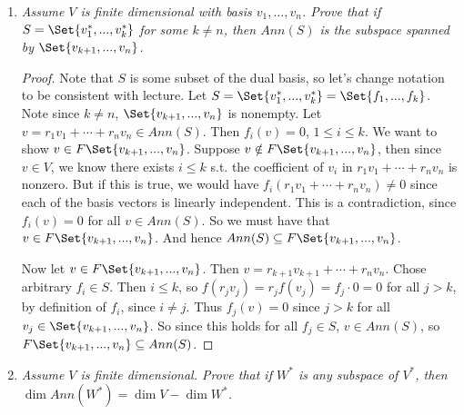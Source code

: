 \documentclass[9pt,reqno,twoside]{amsbook}
\theoremstyle{plain}
\numberwithin{section}{chapter}
\numberwithin{equation}{chapter}
\theoremstyle{definition}
\theoremstyle{remark}
\theoremstyle{plain}
\newcommand{\sub}{\subseteq}
\newcommand{\bb}{\vspace{3mm}}
\renewcommand{\leq}{\leqslant}
\begin{document}
\begin{enumerate}[label=\arabic*.]
\begin{enumerate}
\begin{proof}
 
 
 
 Now let $v \in Ann(S)$. Then since $B_S \sub S$, we know $v \in Ann(B_S)$. Then 
 $$
 FS \sub FB_S = F\Set{f_1,...,f_k} = \Set{r_1f_1 + \cdots + r_kf_k:r_i \in F, f_i \in B_S}.
 $$
  Then $f_i(v) = 0$ for all $i$ since they are in $B_S$, and $r_i \cdot 0 = 0$, so $v \in Ann(FB_S) \sub Ann(FS)$ since $FS \sub FB_S$. Hence $Ann(S) \sub Ann(FS)$, and so they are equal. 
\end{proof}

\bb

\item \textit{Assume $V$ is finite dimensional with basis $v_1,...,v_n$. Prove that if $S = \Set{v_1^*,...,v_k^*}$ for some $k \neq n$, then $Ann(S)$ is the subspace spanned by $\Set{v_{k + 1},...,v_n}$. }

\bb

\begin{proof}
Note that $S$ is some subset of the dual basis, so let's change notation to be consistent with lecture. Let $S = \Set{v_1^*,...,v_k^*} = \Set{f_1,...,f_k}$. Note since $k \neq n$, $\Set{v_{k + 1},...,v_n}$ is nonempty. Let $v = r_1v_1 + \cdots + r_nv_n \in Ann(S)$. Then $f_i(v) = 0$, $1 \leq i \leq k$. We want to show $v \in F\Set{v_{k + 1},...,v_n}$. Suppose $v \notin  F\Set{v_{k + 1},...,v_n}$, then since $v \in V$, we know there exists $i \leq k$ s.t. the coefficient of $v_i$ in $r_1v_1 + \cdots + r_nv_n$ is nonzero. But if this is true, we would have $f_i(r_1v_1 + \cdots + r_nv_n) \neq 0$ since each of the basis vectors is linearly independent. This is a contradiction, since $f_i(v) = 0$ for all $v \in Ann(S)$. So we must have that $v \in  F\Set{v_{k + 1},...,v_n}$. And hence $Ann(S) \sub F\Set{v_{k + 1},...,v_n}$. 

Now let $v \in F\Set{v_{k + 1},...,v_n}$. Then $v = r_{k + 1}v_{k + 1} + \cdots + r_nv_n$. Chose arbitrary $f_i \in S$. Then $i \leq k$, so $f(r_jv_j) = r_jf(v_j) = f_j\cdot 0 = 0$ for all $j > k$, by definition of $f_i$, since $i \neq j$. Thus $f_j(v) = 0$ since $j > k$ for all $v_j \in \Set{v_{k + 1},...,v_n}$. So since this holds for all $f_j \in S$, $v \in Ann(S)$, so $F\Set{v_{k + 1},...,v_n} \sub Ann(S)$. 
\end{proof}

\bb

\item \textit{Assume $V$ is finite dimensional. Prove that if $W^*$ is any subspace of $V^*$, then $\dim Ann(W^*) = \dim V - \dim W^*$. }

\bb


\end{enumerate}
\end{enumerate}
\end{document}
